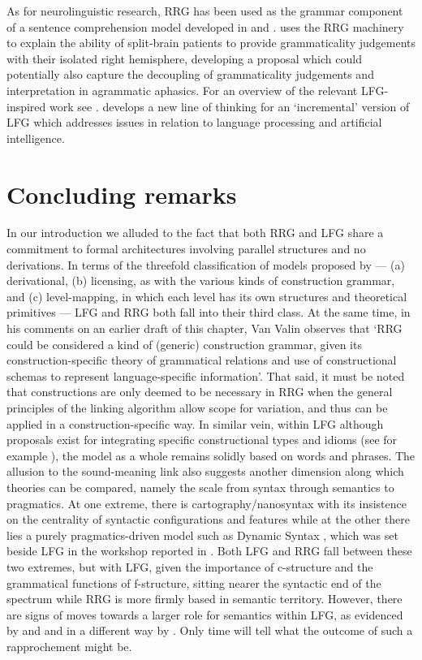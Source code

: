 \documentclass[output=paper,hidelinks]{langscibook}
\begin{document}
As for neurolinguistic research, RRG has been used as the grammar component of a sentence comprehension model developed in \citet{Bornkessel2004} and \citet{Bornkessel2006}. \citet{VanValin2022} uses the RRG machinery to explain the ability of split-brain patients to provide grammaticality judgements with their isolated right hemisphere, developing a proposal which could potentially also capture the decoupling of grammaticality judgements and interpretation in agrammatic aphasics. For an overview of the relevant LFG-inspired work see \citet[726-728]{DLM:LFG}. \citet{Jones2019} develops a new line of thinking for an `incremental' version of LFG which addresses issues in relation to language processing and artificial intelligence.

\section{Concluding remarks}
\label{sec:RRG:7}

In our introduction we alluded to the fact that both RRG and LFG share a commitment to formal architectures involving parallel structures and no derivations. In terms of the threefold classification of models proposed by \citet{Francis2003}  ---  (a) derivational, (b) licensing, as with the various kinds of construction grammar, and (c) level-mapping, in which each level has its own structures and theoretical primitives  ---  LFG and RRG both fall into their third class. At the same time, in his comments on an earlier draft of this chapter, Van Valin observes that `RRG could be considered a kind of (generic) construction grammar, given its construction-specific theory of grammatical relations and use of constructional schemas to represent language-specific information'. That said, it must be noted that constructions are only deemed to be necessary in RRG when the general principles of the linking algorithm allow scope for variation, and thus can be applied in a construction-specific way. In similar vein, within LFG although proposals exist for integrating specific constructional types and idioms (see for example \citealt{asudeh2013constructions}), the model as a whole remains solidly based on words and phrases. The allusion to the sound-meaning link also suggests another dimension along which theories can be compared, namely the scale from syntax through semantics to pragmatics. At one extreme, there is cartography/nanosyntax with its insistence on the centrality of syntactic configurations and features while at the other there lies a purely pragmatics-driven model such as Dynamic Syntax \citep{KempsonCannGregoromichelakiChatzikyriakidis2016,KempsonCannGregoromichelakiChatzikyriakidis2017}, which was set beside LFG in the workshop reported in \citet{Vincent2009}. Both LFG and RRG fall between these two extremes, but with LFG, given the importance of c-structure and the grammatical functions of f-structure, sitting nearer the syntactic end of the spectrum while RRG is more firmly based in semantic territory. However, there are signs of moves towards a larger role for semantics within LFG, as evidenced by \citet[Chapter~8]{DLM:LFG} and  and in a different way by . Only time will tell what the outcome of such a rapprochement might be.
\end{document}
